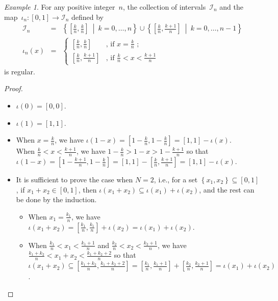 \documentclass{article}
\theoremstyle{remark}
\newtheorem{example}{Example}
\newcommand{\set}[2]{\ensuremath{\left\{ {#1}~\middle|~{#2}\right\} }}
\begin{document}
\begin{example}For any positive integer~$n$, the collection of
intervals~$\mathscr{I}_{n}$ and the map~$\iota_{n}:\left[0,1\right]\rightarrow\mathscr{I}_{n}$
defined by
\begin{eqnarray*}
\mathscr{I}_{n} & = & \set{\left[\frac{k}{n},\frac{k}{n}\right]}{k=0,\ldots,n}\cup\set{\left[\frac{k}{n},\frac{k+1}{n}\right]}{k=0,\ldots,n-1}\\
\iota_{n}\left(x\right) & = & \begin{cases}
\left[\frac{k}{n},\frac{k}{n}\right] & \textrm{, if }x=\frac{k}{n}\textrm{ ;}\\
\left[\frac{k}{n},\frac{k+1}{n}\right] & \textrm{, if }\frac{k}{n}<x<\frac{k+1}{n}
\end{cases}
\end{eqnarray*}
is regular.\end{example}
\begin{proof}
~
\begin{itemize}
\item $\iota\left(0\right)=\left[0,0\right]$.
\item $\iota\left(1\right)=\left[1,1\right]$. 
\item When $x=\frac{k}{n}$, we have $\iota\left(1-x\right)=\left[1-\frac{k}{n},1-\frac{k}{n}\right]=\left[1,1\right]-\iota\left(x\right)$.\\
When $\frac{k}{n}<x<\frac{k+1}{n}$, we have $1-\frac{k}{n}>1-x>1-\frac{k+1}{n}$
so that $\iota\left(1-x\right)=\left[1-\frac{k+1}{n},1-\frac{k}{n}\right]=\left[1,1\right]-\left[\frac{k}{n},\frac{k+1}{n}\right]=\left[1,1\right]-\iota\left(x\right)$.
\item It is sufficient to prove the case when $N=2$, i.e., for a set $\left\{ x_{1},x_{2}\right\} \subseteq\left[0,1\right]$,
if $x_{1}+x_{2}\in\left[0,1\right]$, then $\iota\left(x_{1}+x_{2}\right)\subseteq\iota\left(x_{1}\right)+\iota\left(x_{2}\right)$,
and the rest can be done by the induction. 
\begin{itemize}
\item When $x_{1}=\frac{k_{1}}{n}$, we have $\iota\left(x_{1}+x_{2}\right)=\left[\frac{k_{1}}{n},\frac{k_{1}}{n}\right]+\iota\left(x_{2}\right)=\iota\left(x_{1}\right)+\iota\left(x_{2}\right)$.
\item When $\frac{k_{1}}{n}<x_{1}<\frac{k_{1}+1}{n}$ and $\frac{k_{2}}{n}<x_{2}<\frac{k_{2}+1}{n}$,
we have $\frac{k_{1}+k_{2}}{n}<x_{1}+x_{2}<\frac{k_{1}+k_{2}+2}{n}$
so that $\iota\left(x_{1}+x_{2}\right)\subseteq\left[\frac{k_{1}+k_{2}}{n},\frac{k_{1}+k_{2}+2}{n}\right]=\left[\frac{k_{1}}{n},\frac{k_{1}+1}{n}\right]+\left[\frac{k_{2}}{n},\frac{k_{2}+1}{n}\right]=\iota\left(x_{1}\right)+\iota\left(x_{2}\right)$.
\end{itemize}
\end{itemize}
\end{proof}
\end{document}
